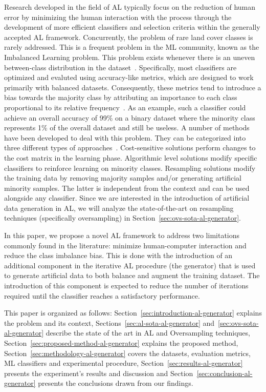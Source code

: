 Research developed in the field of AL typically focus on the reduction of
human error by minimizing the human interaction with the process through the
development of more efficient classifiers and selection criteria within the
generally accepted AL framework. Concurrently, the problem of rare land cover
classes is rarely addressed. This is a frequent problem in the ML community,
known as the Imbalanced Learning problem. This problem exists whenever there
is an uneven between-class distribution in the dataset~\cite{Chawla2004}.
Specifically, most classifiers are optimized and evaluted using accuracy-like
metrics, which are designed to work primarily with balanced datasets.
Consequently, these metrics tend to introduce a bias towards the majority
class by attributing an importance to each class proportional to its relative
frequency~\cite{Maxwell2018}. As an example, such a classifier could achieve
an overall accuracy of 99\% on a binary dataset where the minority class
represents 1\% of the overall dataset and still be useless. A number of
methods have been developed to deal with this problem.  They can be
categorized into three different types of
approaches~\cite{Fernandez2013,Kaur2019}.  Cost-sensitive solutions perform
changes to the cost matrix in the learning phase. Algorithmic level solutions
modify specific classifiers to reinforce learning on minority classes.
Resampling solutions modify the training data by removing majority samples
and/or generating artificial minority samples. The latter is independent from
the context and can be used alongside any classifier.  Since we are interested
in the introduction of artificial data generation in AL, we will analyze the
state-of-the-art on resampling techniques (specifically oversampling) in
Section~\ref{sec:ovs-sota-al-generator}.

In this paper, we propose a novel AL framework to address two limitations
commonly found in the literature: minimize human-computer interaction and
reduce the class imbalance bias. This is done with the introduction of an
additional component in the iterative AL procedure (the generator) that
is used to generate artificial data to both balance and augment the training
dataset. The introduction of this component is expected to reduce the number
of iterations required until the classifier reaches a satisfactory
performance.

This paper is organized as follows: Section~\ref{sec:introduction-al-generator} explains
the problem and its context, Sections~\ref{sec:al-sota-al-generator} and~\ref{sec:ovs-sota-al-generator}
describe the state of the art in AL and Oversampling techniques,
Section~\ref{sec:proposed-method-al-generator} explains the proposed method,
Section~\ref{sec:methodology-al-generator} covers the datasets, evaluation metrics, ML
classifiers and experimental procedure, Section~\ref{sec:results-al-generator} presents the
experiment's results and discussion and Section~\ref{sec:conclusion-al-generator} presents
the conclusions drawn from our findings.

